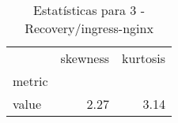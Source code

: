 \begin{table}[htbp]
\caption{Estatísticas para 3 - Recovery/ingress-nginx}
\label{tab:3_-_recovery_ingress-nginx_skewkurt}
\begin{tabular}{lrr}
\toprule
 & skewness & kurtosis \\
metric &  &  \\
\midrule
value & 2.27 & 3.14 \\
\bottomrule
\end{tabular}
\end{table}
